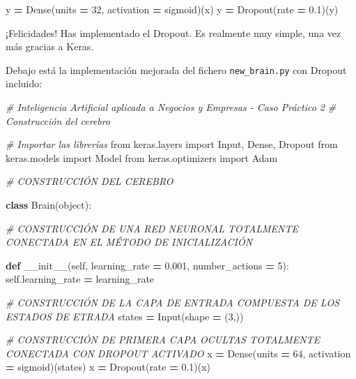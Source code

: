 \documentclass[
]{book}
\newenvironment{Shaded}{\begin{snugshade}}{\end{snugshade}}
\newcommand{\BuiltInTok}[1]{#1}
\newcommand{\CommentTok}[1]{\textcolor[rgb]{0.56,0.35,0.01}{\textit{#1}}}
\newcommand{\DecValTok}[1]{\textcolor[rgb]{0.00,0.00,0.81}{#1}}
\newcommand{\FloatTok}[1]{\textcolor[rgb]{0.00,0.00,0.81}{#1}}
\newcommand{\FunctionTok}[1]{\textcolor[rgb]{0.00,0.00,0.00}{#1}}
\newcommand{\ImportTok}[1]{#1}
\newcommand{\KeywordTok}[1]{\textcolor[rgb]{0.13,0.29,0.53}{\textbf{#1}}}
\newcommand{\NormalTok}[1]{#1}
\newcommand{\OperatorTok}[1]{\textcolor[rgb]{0.81,0.36,0.00}{\textbf{#1}}}
\newcommand{\StringTok}[1]{\textcolor[rgb]{0.31,0.60,0.02}{#1}}
\newcommand{\VariableTok}[1]{\textcolor[rgb]{0.00,0.00,0.00}{#1}}
\begin{document}
\begin{Shaded}
\begin{Highlighting}[]
\NormalTok{    y }\OperatorTok{=}\NormalTok{ Dense(units }\OperatorTok{=} \DecValTok{32}\NormalTok{, activation }\OperatorTok{=} \StringTok{\textquotesingle{}sigmoid\textquotesingle{}}\NormalTok{)(x)}
\NormalTok{    y }\OperatorTok{=}\NormalTok{ Dropout(rate }\OperatorTok{=} \FloatTok{0.1}\NormalTok{)(y)}
\end{Highlighting}
\end{Shaded}

¡Felicidades! Has implementado el Dropout. Es realmente muy simple, una vez más gracias a Keras.

Debajo está la implementación mejorada del fichero \texttt{new\_brain.py} con Dropout incluido:

\begin{Shaded}
\begin{Highlighting}[]
\CommentTok{\# Inteligencia Artificial aplicada a Negocios y Empresas {-} Caso Práctico 2}
\CommentTok{\# Construcción del cerebro}

\CommentTok{\# Importar las librerías}
\ImportTok{from}\NormalTok{ keras.layers }\ImportTok{import}\NormalTok{ Input, Dense, Dropout}
\ImportTok{from}\NormalTok{ keras.models }\ImportTok{import}\NormalTok{ Model}
\ImportTok{from}\NormalTok{ keras.optimizers }\ImportTok{import}\NormalTok{ Adam}

\CommentTok{\# CONSTRUCCIÓN DEL CEREBRO}

\KeywordTok{class}\NormalTok{ Brain(}\BuiltInTok{object}\NormalTok{):}
    
    \CommentTok{\# CONSTRUCCIÓN DE UNA RED NEURONAL TOTALMENTE CONECTADA EN EL MÉTODO DE INICIALIZACIÓN}
    
    \KeywordTok{def} \FunctionTok{\_\_init\_\_}\NormalTok{(}\VariableTok{self}\NormalTok{, learning\_rate }\OperatorTok{=} \FloatTok{0.001}\NormalTok{, number\_actions }\OperatorTok{=} \DecValTok{5}\NormalTok{):}
        \VariableTok{self}\NormalTok{.learning\_rate }\OperatorTok{=}\NormalTok{ learning\_rate}
        
        \CommentTok{\# CONSTRUCCIÓN DE LA CAPA DE ENTRADA COMPUESTA DE LOS ESTADOS DE ETRADA}
\NormalTok{        states }\OperatorTok{=}\NormalTok{ Input(shape }\OperatorTok{=}\NormalTok{ (}\DecValTok{3}\NormalTok{,))}
        
        \CommentTok{\# CONSTRUCCIÓN DE PRIMERA CAPA OCULTAS TOTALMENTE CONECTADA CON DROPOUT ACTIVADO}
\NormalTok{        x }\OperatorTok{=}\NormalTok{ Dense(units }\OperatorTok{=} \DecValTok{64}\NormalTok{, activation }\OperatorTok{=} \StringTok{\textquotesingle{}sigmoid\textquotesingle{}}\NormalTok{)(states)}
\NormalTok{        x }\OperatorTok{=}\NormalTok{ Dropout(rate }\OperatorTok{=} \FloatTok{0.1}\NormalTok{)(x)}


\end{Highlighting}
\end{Shaded}
\end{document}
